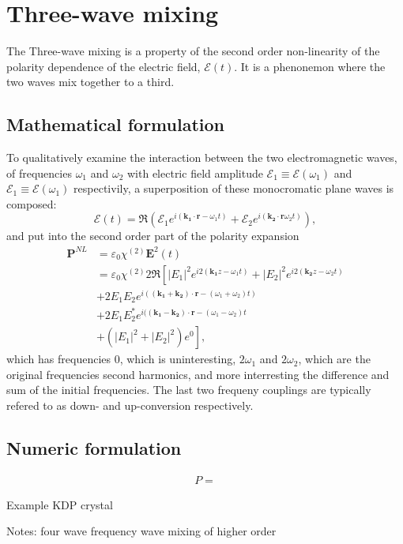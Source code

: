 \chapter{Three-wave mixing}
\label{cha:mixing}


The Three-wave mixing is a property of the second order non-linearity of the polarity dependence of the electric field, $\mathcal{E}(t)$. 
It is a phenonemon where the two waves mix together to a third. 



\section{Mathematical formulation}
\label{sec:mixing-math}

To qualitatively examine the interaction between the two electromagnetic waves, of frequencies $\omega_1$ and $\omega_2$ with electric field amplitude $\mathcal{E}_1  \equiv \mathcal{E}(\omega_1)$ and $\mathcal{E}_1  \equiv \mathcal{E}(\omega_1)$ respectivily, a superposition of these monocromatic plane waves is composed: 
\[
\mathbf{\mathcal{E}}(t) = \Re (\mathcal{E}_1e^{i(\mathbf{k_1} \cdot \mathbf{r} - \omega_1 t)}+\mathcal{E}_2e^{i(\mathbf{k_2} \cdot \mathbf{r} \omega_2 t)}),
\]
and put into the second order part of the polarity expansion
\begin{align*}
     \mathbf{P}^{NL} & = \varepsilon_0 \chi^{(2)} \mathbf{E}^2(t) \\
&= \varepsilon_0 \chi^{(2)} 2 \Re \left[
|E_1|^2e^{i2(\mathbf{k_1} z - \omega_1t)}+|E_2|^2e^{i2(\mathbf{k_2} z - \omega_2t)} \right.\\
& +2E_1E_2e^{i((\mathbf{k_1} + \mathbf{k_2}) \cdot \mathbf{r} - (\omega_1+\omega_2)t)}\\
& +2E_1E_2^*e^{i((\mathbf{k_1} - \mathbf{k_2}) \cdot \mathbf{r} - (\omega_1-\omega_2)t}\\
& \left.+\left(|E_1|^2+|E_2|^2\right)e^{0}\right],
\end{align*}
which has frequencies $0$, which is uninteresting, $2\omega_1$ and $2\omega_2$, which are the original frequencies second harmonics, and more interresting the difference and sum of the initial frequencies. The last two frequeny couplings are typically refered to as down- and up-conversion respectively. 


\section{Numeric formulation}
\label{sec:mixing-numeric}

\begin{align}
P = 
\end{align}


Example KDP crystal

Notes:
four wave frequency wave mixing of higher order

